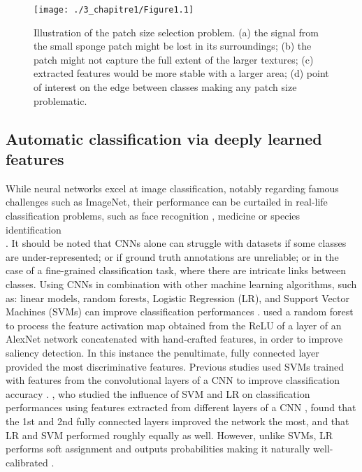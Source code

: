 \begin{figure}[H]
	\begin{center}
	\texttt{[image: ./3\_chapitre1/Figure1.1]}
		\caption[Illustration of the patch size selection problem]{Illustration of the patch size selection problem. (a) the signal from the small sponge patch might be lost in its surroundings; (b) the patch might not capture the full extent of the larger textures; (c) extracted features would be more stable with a larger area; (d) point of interest on the edge between classes making any patch size problematic.}
	\label{figure1.1}
\end{center}
\end{figure}

\vspace{-30pt}

\subsection{Automatic classification via deeply learned features}\label{chapitre1_2.3}
While neural networks excel at image classification, notably regarding famous challenges such as ImageNet, their performance can be curtailed in real-life classification problems, such as face recognition \citep{zhou_naive-deep_2015}, medicine \citep{de_fauw_clinically_2018} or species identification \\
\citep{mehdipour_ghazi_open-set_2016}. It should be noted that CNNs alone can struggle with datasets if some classes are under-represented; or if ground truth annotations are unreliable; or in the case of a fine-grained classification task, where there are intricate links between classes. Using CNNs in combination with other machine learning algorithms, such as: linear models, random forests, Logistic Regression (LR), and Support Vector Machines (SVMs) can improve classification performances \citep{gao_combining_2017, li_visual_2016}. \citet{li_visual_2016} used a random forest to process the feature activation map obtained from the ReLU of a layer of an AlexNet network concatenated with hand-crafted features, in order to improve saliency detection. In this instance the penultimate, fully connected layer provided the most discriminative features. Previous studies used SVMs trained with features from the convolutional layers of a CNN to improve classification accuracy \citep{gao_combining_2017, huang_large-scale_2006}. \citet{donahue_decaf:_2014}, who studied the influence of SVM and LR on classification performances using features extracted from different layers of a CNN \citep{donahue_decaf:_2014}, found that the 1st and 2nd fully connected layers improved the network the most, and that LR and SVM performed roughly equally as well. However, unlike SVMs, LR performs soft assignment and outputs probabilities making it naturally well-calibrated \citep{niculescu-mizil_predicting_2005}.

